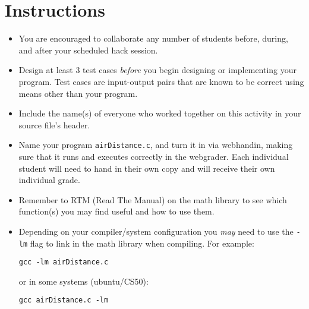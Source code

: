 \documentclass[12pt]{scrartcl}
\begin{document}
\section*{Instructions}

\begin{itemize}
  \item You are encouraged to collaborate any number of students 
  before, during, and after your scheduled hack session.  
  \item Design at least 3 test cases \emph{before} you begin
  designing or implementing your program.  Test cases are 
  input-output pairs that are known to be correct using means
  other than your program.
  \item Include the name(s) of everyone who worked together on
  this activity in your source file's header.
  \item Name your program \texttt{airDistance.c}, and
  turn it in via webhandin, making sure that it runs and executes
  correctly in the webgrader.  Each individual student will need
  to hand in their own copy and will receive their own individual
  grade.
  \item Remember to RTM (Read The Manual) on the math library
  to see which function(s) you may find useful and how to use 
  them.
  \item Depending on your compiler/system configuration you \emph{may}
  need to use the \texttt{-lm} flag to link in the math
  library when compiling.  For example: 

  \texttt{gcc -lm airDistance.c}

  or in some systems (ubuntu/CS50):

  \texttt{gcc airDistance.c -lm }

\end{itemize}
  
\end{document}
